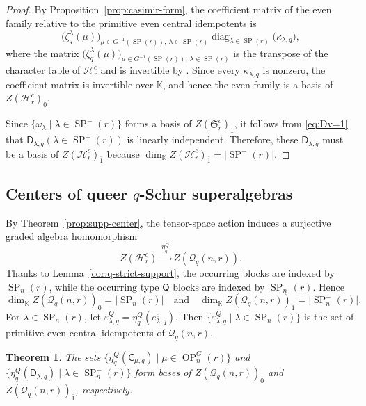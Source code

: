 \documentclass[11pt]{amsart}
\numberwithin{equation}{section}
\theoremstyle{plain}
\newtheorem{thm}{Theorem}[section]
\theoremstyle{definition}
\theoremstyle{remark}
\begin{document}
\begin{proof}
By Proposition~\ref{prop:casimir-form}, the coefficient matrix
of the even family relative to the primitive even central
idempotents is
$$
\bigl(\zeta_q^\lambda(\mu)\bigr)_{
\mu\in G^{-1}(\operatorname{SP}(r)),\ \lambda\in\operatorname{SP}(r)}
\operatorname{diag}_{\lambda\in\operatorname{SP}(r)}
\bigl(\kappa_{\lambda,q}\bigr),
$$
where the matrix $\bigl(\zeta_q^\lambda(\mu)\bigr)_{
\mu\in G^{-1}(\operatorname{SP}(r)),\ \lambda\in\operatorname{SP}(r)}$ is the transpose of the
character table of $\mathcal H_r^c$ and is invertible
by \cite[\S4.2]{WW13}.
Since every $\kappa_{\lambda,q}$ is nonzero, the coefficient
matrix is invertible over $\mathbb K$, and hence the even family is a basis of $Z(\mathcal H_r^c)_{\bar0}$.

Since $\{\omega_\lambda \mid \lambda\in\operatorname{SP}^-(r)\}$ forms a basis of $Z(\mathfrak S_r^c)_{\bar{1}}$, it follows from \eqref{eq:Dv=1} that $\mathsf D_{\lambda,q} (\lambda\in\operatorname{SP}^-(r))$ is linearly independent. Therefore, these $\mathsf D_{\lambda,q}$ must be a basis of $Z(\mathcal H_r^c)_{\bar1}$ because $\dim_{\mathbb K}Z(\mathcal H_r^c)_{\bar1}
=|\operatorname{SP}^{-}(r)|$.
\end{proof}


\subsection{Centers of queer \texorpdfstring{$q$}{q}-Schur superalgebras}

By Theorem~\ref{prop:supp-center}, the tensor-space action
induces a surjective graded algebra homomorphism
$$
Z(\mathcal H_r^c)
\xrightarrow{\ \eta_q^Q\ }
Z(\mathcal Q_q(n,r)).
$$
Thanks to Lemma~\ref{cor:q-strict-support}, the occurring blocks are indexed by $\operatorname{SP}_n(r)$, while the occurring type $\mathsf{Q}$ blocks are indexed by $\operatorname{SP}_n^{-}(r)$. Hence
$$
\dim_{\mathbb K}Z(\mathcal Q_q(n,r))_{\bar0}
=
|\operatorname{SP}_n(r)| \quad \text{and}\quad
\dim_{\mathbb K}Z(\mathcal Q_q(n,r))_{\bar1}
=
|\operatorname{SP}_n^{-}(r)|.
$$
%
For $\lambda\in\operatorname{SP}_n(r)$, let
$\varepsilon_{\lambda,q}^Q=\eta_q^Q(e_{\lambda,q}^c)$.
Then $\{\varepsilon_{\lambda,q}^Q \mid \lambda\in\operatorname{SP}_n(r)\}$ is the set of primitive even central idempotents of $\mathcal Q_q(n,r)$.

\begin{thm}\label{thm:q-even-bases}
The sets
$\{\eta_q^Q(\mathsf C_{\mu,q})
\mid\mu\in\operatorname{OP}_n^G(r)\}$ and $\{\eta_q^Q(\mathsf D_{\lambda,q})
\mid\lambda\in\operatorname{SP}_n^{-}(r)\}$
form bases of $Z(\mathcal Q_q(n,r))_{\bar{0}}$ and $Z(\mathcal Q_q(n,r))_{\bar{1}}$, respectively. 
\end{thm}
\end{document}
